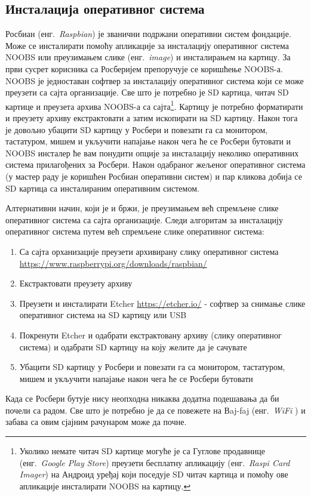 \documentclass[12pt,oneside]{memoir}
\theoremstyle{remark}
\begin{document}
\subsection{Инсталација оперативног система}
Росбиан  (енг.~{\em Raspbian}) је званични подржани оперативни систем фондације. Може се инсталирати помоћу апликације за инсталацију оперативног система NOOBS или преузимањем слике (енг.~{\em image}) и инсталирањем на картицу. 
За први сусрет корисника са Росберијем препоручује се коришћење NOOBS-а. NOOBS је једноставан софтвер за инсталацију оперативног система који се може преузети са сајта организације. 
Све што је потребно је SD картица, читач SD картице и преузета архива NOOBS-а са сајта\footnote{Уколико немате читач SD картице могуће је са Гуглове продавнице (енг.~{\em Google Play Store}) преузети бесплатну апликацију  (енг.~{\em Raspi Card Imager}) на Андроид уређај који поседује SD читач картица и помоћу ове апликације инсталирати NOOBS на картицу.}. Картицу је потребно форматирати и преузету архиву екстрактовати а затим ископирати на SD картицу. Након тога је довољно убацити SD картицу у Росбери и повезати га са монитором, тастатуром, мишем и укључити напајање након чега ће се Росбери бутовати и NOOBS инсталер ће вам понудити опције за инсталацију неколико оперативних система прилагођених за Росбери. Након одабраног жељеног оперативног система (у мастер раду је коришћен Росбиан оперативни систем) и пар кликова добија се SD картица са инсталираним оперативним системом. 

Алтернативни начин, који је и бржи, је преузимањем већ спремљене слике оперативног система са сајта организације. Следи алгоритам за инсталацију оперативног система путем већ спремљене слике оперативног система:
\begin{enumerate}
\item Са сајта орханизације преузети архивирану слику оперативног система\newline
\url{https://www.raspberrypi.org/downloads/raspbian/} 
\item  Екстрактовати преузету архиву
\item Преузети и инсталирати Etcher \url{https://etcher.io/} - софтвер за снимање слике оперативног система на SD картицу или USB
\item Покренути Etcher и одабрати екстрактовану архиву (слику оперативног система) и одабрати SD картицу на коју желите да је сачувате
\item Убацити SD картицу у Росбери и повезати га са монитором, тастатуром, мишем и укључити напајање након чега ће се Росбери бутовати
\end{enumerate}
Када се Росбери бутује нису неопходна никаква додатна подешавања да би почели са радом. Све што је потребно је да се повежете на Вaj-faj  (енг.~{\em WiFi }) и забава са овим сјајним рачунаром може да почне.
\end{document}
